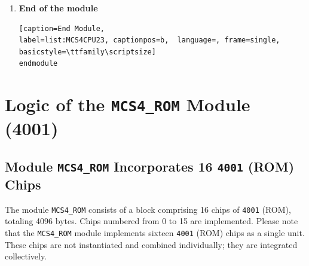\begin{enumerate}[(1)]
\begin{lstlisting}[caption=Instruction control unit, 
label=list:MCS4CPU22, captionpos=b,  language=, frame=single, basicstyle=\ttfamily\scriptsize]
            cy_wrt       = state[`X3];
            pc_inc       = state[`X3];
        end
        //--------------------------------------
        // STC : Set CY
        8'b1111_1010 :
        begin
            cy_set = state[`X3];
            pc_inc = state[`X3];
        end
        //--------------------------------------
        // DAA : Decimal Adjust ACC
        8'b1111_1011 :
        begin
            alu_a_acc = state[`X3];
            alu_daa   = state[`X3];
            acc_alu   = state[`X3] & daa;
            cy_wrt    = state[`X3] & cy_next; // if non carry, do not affect
            pc_inc    = state[`X3];
        end
        //--------------------------------------
        // KBP : Keyboard Process
        8'b1111_1100 :
        begin
            acc_kbp = state[`X3];
            pc_inc  = state[`X3];
        end
        //--------------------------------------
        // DCL : Designate Control Line
        8'b1111_1101 :
        begin
            dcl_set = state[`X3];
            pc_inc  = state[`X3];
        end
        //--------------------------------------
        // Others : Same as NOP
        default :
        begin
            pc_inc = state[`X3];
        end
        //--------------------------------------
    endcase
\end{lstlisting}


\item \textbf{End of the module}\\
\begin{lstlisting}[caption=End Module, 
label=list:MCS4CPU23, captionpos=b,  language=, frame=single, basicstyle=\ttfamily\scriptsize]
endmodule
\end{lstlisting}

\end{enumerate}

\section{Logic of the \texttt{MCS4\_ROM} Module (4001)}
\subsection{\textbf{Module \texttt{MCS4\_ROM} Incorporates 16 \texttt{4001} (ROM) Chips}}
The module \texttt{MCS4\_ROM} consists of a block comprising 16 chips of \texttt{4001} (ROM), totaling 4096 bytes. Chips numbered from 0 to 15 are implemented.  Please note that the \texttt{MCS4\_ROM} module implements sixteen \texttt{4001} (ROM) chips as a single unit. These chips are not instantiated and combined individually; they are integrated collectively.

